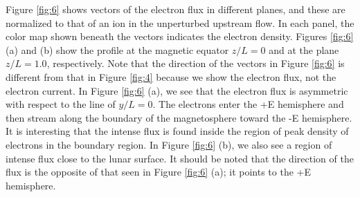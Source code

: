 \documentclass[draft,jgrga]{agutex2015}
\begin{document}
\begin{article}
Figure \ref{fig:6} shows vectors of the electron flux in different planes, and these are
normalized to that of an ion in the unperturbed upstream flow.
%
In each panel, the color map shown beneath the vectors indicates the electron density.
Figures \ref{fig:6} (a) and (b) show the profile 
at the magnetic equator $z/L=0$ and at the plane $z/L=1.0$, respectively. 
Note that the direction of the vectors in Figure \ref{fig:6} is
different from that in Figure \ref{fig:4} because 
we show the electron flux, not the electron current.
In Figure \ref{fig:6} (a),  
we see that the electron flux is asymmetric with respect to the line of $y/L=0$.
The electrons enter the +E hemisphere  
and then stream along the boundary of the magnetosphere toward the -E hemisphere.
It is interesting that the intense flux is found inside the region of peak density of electrons in the boundary region.
In Figure \ref{fig:6} (b),
we also see a region of intense flux close to the lunar surface.
It should be noted that the direction of the flux is the 
opposite of that seen in Figure \ref{fig:6} (a); it points to the +E hemisphere.


\end{article}
\end{document}
